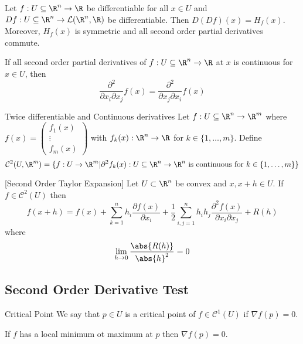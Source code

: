\documentclass[a4paper]{article}
\begin{document}
\begin{prp}{}{} Let $f:U\subseteq\R^n\to\R$ be differentiable for all $x\in U$ and $Df:U\subseteq\R^n\to\mathcal{L}(\R^n,\R)$ be differentiable. Then $D(Df)(x)=H_f(x)$. Moreover, $H_f(x)$ is symmetric and all second order partial derivatives commute. 
\end{prp}

\begin{lmm}{}{} If all second order partial derivatives of $f:U\subseteq\R^n\to\R$ at $x$ is continuous for $x\in U$, then $$\frac{\partial^2}{\partial x_i\partial x_j}f(x)=\frac{\partial^2}{\partial x_j\partial x_i}f(x)$$
\end{lmm}

\begin{defn}{Twice differentiable and Continuous derivatives}{} Let $f:U\subseteq\R^n\to\R^m$ where $f(x)=\begin{pmatrix}f_1(x)\\\vdots\\f_m(x)\end{pmatrix}$ with $f_k(x):\R^n\to\R$ for $k\in\{1,\dots,m\}$. Define $$\mathcal{C}^2(U,\R^m)=\{f:U\to\R^m|\partial^2f_k(x):U\subseteq\R^n\to\R^n\text{ is continuous for }k\in\{1,\dots,m\}\}$$
\end{defn}

\begin{thm}{}{}[Second Order Taylor Expansion] Let $U\subset\R^n$ be convex and $x,x+h\in U$. If $f\in\mathcal{C}^2(U)$ then $$f(x+h)=f(x)+\sum_{k=1}^nh_i\frac{\partial f(x)}{\partial x_i}+\frac{1}{2}\sum_{i,j=1}^nh_ih_j\frac{\partial^2f(x)}{\partial x_i\partial x_j}+R(h)$$ where $$\lim_{h\to 0}\frac{\abs{R(h)}}{\abs{h}^2}=0$$
\end{thm}

\subsection{Second Order Derivative Test}
\begin{defn}{Critical Point}{} We say that $p\in U$ is a critical point of $f\in\mathcal{C}^1(U)$ if $\nabla f(p)=0$. 
\end{defn}

\begin{prp}{}{} If $f$ has a local minimum ot maximum at $p$ then $\nabla f(p)=0$. 
\end{prp}
\end{document}
